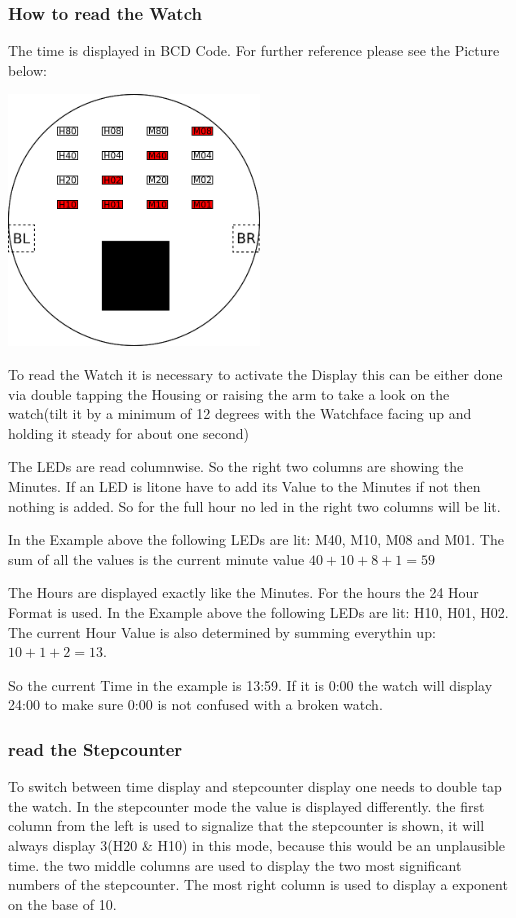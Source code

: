 \subsubsection{How to read the Watch}
The time is displayed in BCD Code. For further reference please see the Picture below:
\begin{center}
  \includegraphics[width=0.5\textwidth]{drawings/BinDia1359.png}
\label{fig:BinWatchFace}
\end{center}
To read the Watch it is necessary to activate the Display this can be either done via double tapping the Housing or raising the arm to take a look on the watch(tilt it by a minimum of 12 degrees with the Watchface facing up and holding it steady for about one second)

The LEDs are read columnwise. So the right two columns are showing the Minutes. If an LED is litone have to add its Value to the Minutes if not then nothing is added. So for the full hour no led in the right two columns will be lit.

In the Example above the following LEDs are lit: M40, M10, M08 and M01.
The sum of all the values is the current minute value $40+10+8+1=59$

The Hours are displayed exactly like the Minutes. For the hours the 24 Hour Format is used. In the Example above the following LEDs are lit: H10, H01, H02. The current Hour Value is also determined by summing everythin up: $10+1+2=13$.

So the current Time in the example is 13:59. If it is 0:00 the watch will display 24:00 to make sure 0:00 is not confused with a broken watch.
\subsubsection{read the Stepcounter}
To switch between time display and stepcounter display one needs to double tap the watch. In the stepcounter mode the value is displayed differently. the first column from the left is used to signalize that the stepcounter is shown, it will always display 3(H20 \& H10) in this mode, because this would be an unplausible time. the two middle columns are used to display the two most significant numbers of the stepcounter. The most right column is used to display a exponent on the base of 10.
